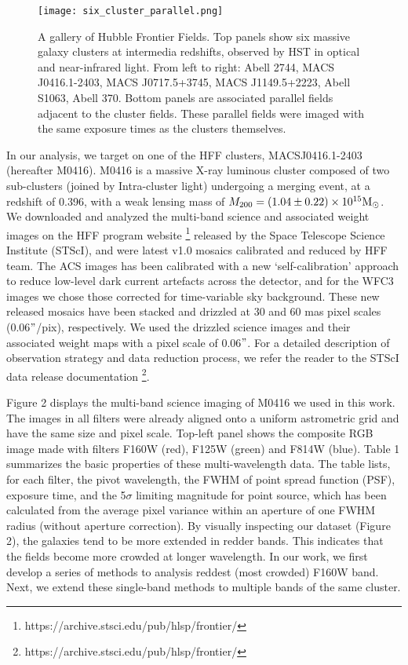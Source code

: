 \documentclass[12pt]{article}
\begin{document}
\begin{figure}[h]
\begin{center}
\texttt{[image: six\_cluster\_parallel.png]}
\caption{\footnotesize A gallery of Hubble Frontier Fields. Top  panels show six massive galaxy clusters at intermedia redshifts, observed by HST in optical and near-infrared light. From left to right:  Abell 2744, MACS J0416.1-2403, MACS J0717.5+3745, MACS J1149.5+2223, Abell S1063, Abell 370. Bottom panels are associated parallel fields adjacent to the cluster fields. These parallel fields were imaged with the same exposure times as the clusters themselves.    }
\end{center}
\end{figure}

In our analysis, we target on one of the HFF clusters, MACSJ0416.1-2403 (hereafter M0416).
M0416 is a massive X-ray luminous cluster composed of two sub-clusters (joined by Intra-cluster light) undergoing a merging event, at a redshift of 0.396, with a weak lensing mass of $M_{200}=(1.04\pm0.22) \times 10^{15}  {\rm M}_{\odot}$.
We downloaded and analyzed the multi-band science and associated weight images on the HFF program website \footnote{https://archive.stsci.edu/pub/hlsp/frontier/} released by the Space Telescope Science Institute (STScI), and were latest v1.0 mosaics calibrated and reduced by HFF team.
The ACS images has been calibrated with a new `self-calibration' approach to reduce low-level dark current artefacts across the detector, and for the WFC3 images  we chose those corrected for time-variable sky background.
These new released mosaics have been stacked and drizzled at 30 and 60 mas pixel scales (0.06$"$/pix), respectively.
We used the drizzled science images and their associated weight maps with a pixel scale of 0.06$"$. 
For a detailed description of observation strategy and data reduction process, we refer the reader to the STScI data release documentation \footnote{https://archive.stsci.edu/pub/hlsp/frontier/}.

Figure 2 displays the multi-band science imaging of M0416 we used in this work. 
The images in all filters were already aligned onto a uniform astrometric grid and have the same size and pixel scale.
Top-left panel shows the composite RGB image made with filters F160W (red), F125W (green) and F814W (blue).
Table 1 summarizes the basic properties of these multi-wavelength data.  The table lists, for each filter, the  pivot wavelength, the FWHM of point spread function (PSF), exposure time, and the 5$\sigma$  limiting magnitude for point source, which has been calculated from the average pixel variance within an aperture of one FWHM radius (without aperture correction).
By visually inspecting our dataset (Figure 2), the galaxies tend to be more extended in redder bands.
This indicates that the fields become more crowded at longer wavelength. 
In our work, we first develop a series of methods to analysis reddest (most crowded) F160W band. 
Next, we extend these single-band methods to multiple bands of the same cluster.
\end{document}
